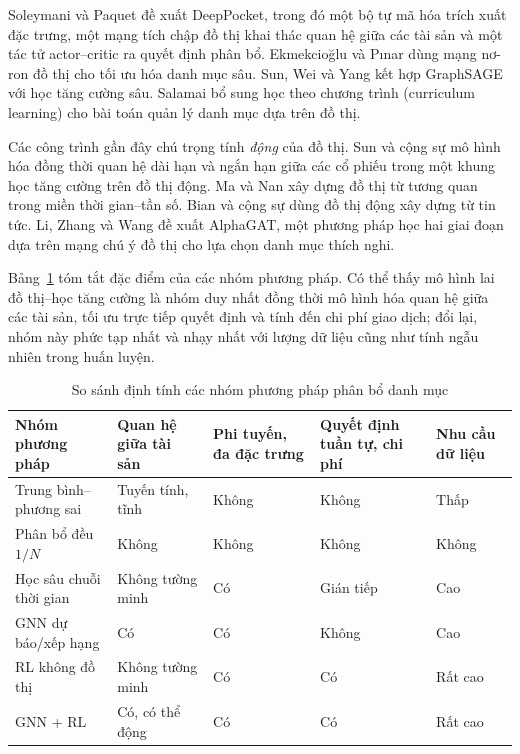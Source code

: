 Soleymani và Paquet \cite{soleymani2021} đề xuất DeepPocket, trong đó một bộ tự mã hóa trích xuất đặc trưng, một mạng tích chập đồ thị khai thác quan hệ giữa các tài sản và một tác tử actor--critic ra quyết định phân bổ. Ekmekcioğlu và Pınar \cite{ekmekcioglu2023} dùng mạng nơ-ron đồ thị cho tối ưu hóa danh mục sâu. Sun, Wei và Yang \cite{sun2024graphsage} kết hợp GraphSAGE với học tăng cường sâu. Salamai \cite{salamai2024} bổ sung học theo chương trình (curriculum learning) cho bài toán quản lý danh mục dựa trên đồ thị.

Các công trình gần đây chú trọng tính \emph{động} của đồ thị. Sun và cộng sự \cite{sun2024cikm} mô hình hóa đồng thời quan hệ dài hạn và ngắn hạn giữa các cổ phiếu trong một khung học tăng cường trên đồ thị động. Ma và Nan \cite{ma2024} xây dựng đồ thị từ tương quan trong miền thời gian--tần số. Bian và cộng sự \cite{bian2024} dùng đồ thị động xây dựng từ tin tức. Li, Zhang và Wang \cite{li2025alphagat} đề xuất AlphaGAT, một phương pháp học hai giai đoạn dựa trên mạng chú ý đồ thị cho lựa chọn danh mục thích nghi.

Bảng~\ref{tab:related} tóm tắt đặc điểm của các nhóm phương pháp. Có thể thấy mô hình lai đồ thị--học tăng cường là nhóm duy nhất đồng thời mô hình hóa quan hệ giữa các tài sản, tối ưu trực tiếp quyết định và tính đến chi phí giao dịch; đổi lại, nhóm này phức tạp nhất và nhạy nhất với lượng dữ liệu cũng như tính ngẫu nhiên trong huấn luyện.

\begin{table}[ht]
\centering\small
\caption{So sánh định tính các nhóm phương pháp phân bổ danh mục}
\label{tab:related}
\begin{tabularx}{\textwidth}{@{}p{3.7cm}>{\centering\arraybackslash}X>{\centering\arraybackslash}X>{\centering\arraybackslash}X>{\centering\arraybackslash}X@{}}
\toprule
Nhóm phương pháp & Quan hệ giữa tài sản & Phi tuyến, đa đặc trưng & Quyết định tuần tự, chi phí & Nhu cầu dữ liệu \\
\midrule
Trung bình--phương sai \cite{markowitz1952,ledoit2004} & Tuyến tính, tĩnh & Không & Không & Thấp \\
Phân bổ đều $1/N$ \cite{demiguel2009} & Không & Không & Không & Không \\
Học sâu chuỗi thời gian \cite{fischer2018,ma2023} & Không tường minh & Có & Gián tiếp & Cao \\
GNN dự báo/xếp hạng \cite{chen2018,feng2019,kim2019} & Có & Có & Không & Cao \\
RL không đồ thị \cite{jiang2017,liu2020finrl} & Không tường minh & Có & Có & Rất cao \\
GNN + RL \cite{soleymani2021,sun2024cikm,li2025alphagat} & Có, có thể động & Có & Có & Rất cao \\
\bottomrule
\end{tabularx}
\end{table}

